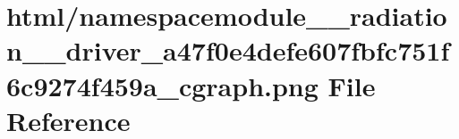 \hypertarget{namespacemodule____radiation____driver__a47f0e4defe607fbfc751f6c9274f459a__cgraph_8png}{}\section{html/namespacemodule\+\_\+\+\_\+radiation\+\_\+\+\_\+driver\+\_\+a47f0e4defe607fbfc751f6c9274f459a\+\_\+cgraph.png File Reference}
\label{namespacemodule____radiation____driver__a47f0e4defe607fbfc751f6c9274f459a__cgraph_8png}
